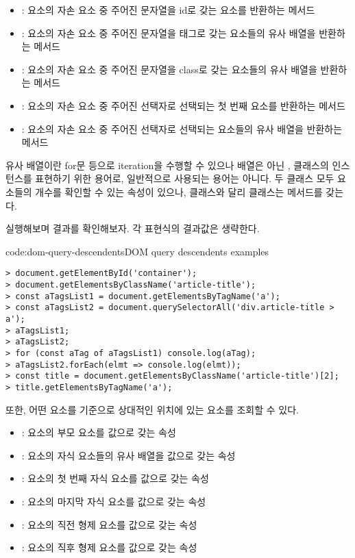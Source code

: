\begin{itemize}
    \item {}: 요소의 자손 요소 중 주어진 문자열을 id로 갖는 요소를 반환하는 메서드
    \item {}: 요소의 자손 요소 중 주어진 문자열을 태그로 갖는 요소들의 유사 배열을 반환하는 메서드
    \item {}: 요소의 자손 요소 중 주어진 문자열을 class로 갖는 요소들의 유사 배열을 반환하는 메서드
    \item {}: 요소의 자손 요소 중 주어진 선택자로 선택되는 첫 번째 요소를 반환하는 메서드
    \item {}: 요소의 자손 요소 중 주어진 선택자로 선택되는 요소들의 유사 배열을 반환하는 메서드
\end{itemize}

유사 배열이란 for문 등으로 iteration을 수행할 수 있으나 배열은 아닌 ,  클래스의 인스턴스를 표현하기 위한 용어로, 일반적으로 사용되는 용어는 아니다. 두 클래스 모두 요소들의 개수를 확인할 수 있는  속성이 있으나,  클래스와 달리  클래스는  메서드를 갖는다.

\를 실행해보며 결과를 확인해보자. 각 표현식의 결과값은 생략한다.

\begin{code}{code:dom-query-descendents}{DOM query descendents examples}
\begin{verbatim}
> document.getElementById('container');
> document.getElementsByClassName('article-title');
> const aTagsList1 = document.getElementsByTagName('a');
> const aTagsList2 = document.querySelectorAll('div.article-title > a');
> aTagsList1;
> aTagsList2;
> for (const aTag of aTagsList1) console.log(aTag);
> aTagsList2.forEach(elmt => console.log(elmt));
> const title = document.getElementsByClassName('article-title')[2];
> title.getElementsByTagName('a');
\end{verbatim}
\end{code}

또한, 어떤 요소를 기준으로 상대적인 위치에 있는 요소를 조회할 수 있다.

\begin{itemize}
    \item {}: 요소의 부모 요소를 값으로 갖는 속성
    \item {}: 요소의 자식 요소들의 유사 배열을 값으로 갖는 속성
    \item {}: 요소의 첫 번째 자식 요소를 값으로 갖는 속성
    \item {}: 요소의 마지막 자식 요소를 값으로 갖는 속성
    \item {}: 요소의 직전 형제 요소를 값으로 갖는 속성
    \item {}: 요소의 직후 형제 요소를 값으로 갖는 속성
\end{itemize}

